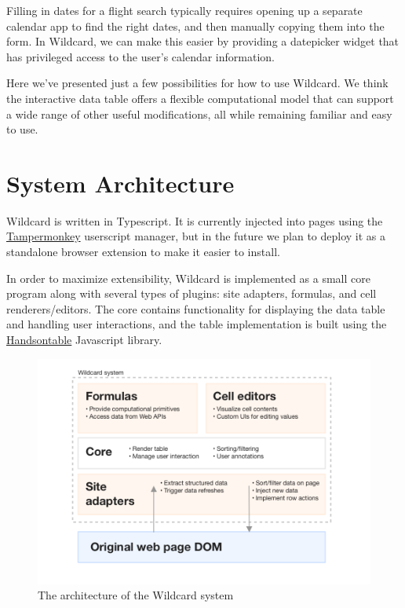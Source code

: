 \documentclass[english,submission]{programming}
\begin{document}
Filling in dates for a flight search typically requires opening up a
separate calendar app to find the right dates, and then manually copying
them into the form. In Wildcard, we can make this easier by providing a
datepicker widget that has privileged access to the user's calendar
information.

Here we've presented just a few possibilities for how to use Wildcard.
We think the interactive data table offers a flexible computational
model that can support a wide range of other useful modifications, all
while remaining familiar and easy to use.

\hypertarget{system-architecture}{%
\section{System Architecture}\label{system-architecture}}

Wildcard is written in Typescript. It is currently injected into pages
using the \href{https://www.tampermonkey.net/}{Tampermonkey} userscript
manager, but in the future we plan to deploy it as a standalone browser
extension to make it easier to install.

In order to maximize extensibility, Wildcard is implemented as a small
core program along with several types of plugins: site adapters,
formulas, and cell renderers/editors. The core contains functionality
for displaying the data table and handling user interactions, and the
table implementation is built using the
\href{https://handsontable.com/}{Handsontable} Javascript library.

\begin{figure}
\centering
\includegraphics{media/architecture-clean.png}
\caption{The architecture of the Wildcard system}
\end{figure}
\end{document}
